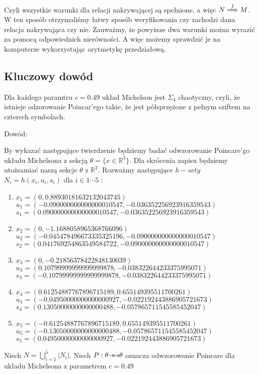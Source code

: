 Czyli wszystkie warunki dla relacji nakrywającej są spełnione, a więc $N \stackrel{f}{\Longrightarrow} M$. 
W ten sposób otrzymaliśmy łatwy sposób weryfikowania czy zachodzi dana relacja nakrywająca czy nie. Zauważmy, że powyższe dwa 
warunki można wyrazić za pomocą odpowiednich nierówności. A więc możemy sprawdzić je na komputerze wykorzystując arytmetykę przedziałową.

\subsection{Kluczowy dowód}

\begin{theorem}
  Dla każdego paramtru $ c = 0.49 $ układ Michelson jest $ \Sigma_4 $ chaotyczny,
  czyli, że istnieje odzorowanie Poincar'ego takie, że jest półsprzężone z pełnym sziftem na czterech symbolach.
\end{theorem}

Dowód:

By wykazać następujące twierdzenie będziemy badać odwzorowanie Poincare'go układu Michelsona z sekcją $ \theta = \{ x \in \mathbb R^3 \} $.
Dla skrócenia zapisu będziemy utożsamiać naszą sekcje $ \theta $ z $ \mathbb R^2 $.
Rozważmy następujące $ h-sety $ $ N_i = h(x_i,u_i,s_i) $ dla $ i \in 1 \cdots 5 $ :

\begin{enumerate}
\item $ x_1 = (0,0.88930181632132043745) $ $ u_1 = (-0.090000000000000010547,-0.036352256923916359543) $ $ s_1 = (0.090000000000000010547,-0.036352256923916359543) $ 
\item $ x_2 = (0,-1.1688058965368766096) $ $ u_2 = (-0.045478496673335325196,-0.090000000000000010547) $ $ s_2 = (0.041769254863549584722,-0.090000000000000010547) $ 
\item $ x_3 = (0,-0.21856378422848130039) $ $ u_3 = (0.10799999999999999878,-0.038322644233375995071) $ $ s_3 = (-0.10799999999999999878,-0.038322644233375995071) $ 
\item $ x_4 = (0.61254887767896715189,0.655149395511700261) $ $ u_4 = (-0.04950000000000000927,-0.022192443886905721673) $ $ s_4 = (0.13050000000000000488,-0.057865711545585452047) $ 
\item $ x_5 = (-0.61254887767896715189,0.655149395511700261) $ $ u_5 = (-0.13050000000000000488,-0.057865711545585452047) $ $ s_5 = (0.04950000000000000927,-0.022192443886905721673) $ 
\end{enumerate}

Niech $ N = \bigcup^5_{i=1} | N_i| $. Niech $ P : \theta {\mathrel{\longrightarrow\mkern-25mu\circ}\;\;} \theta $ oznacza odwzorowanie Poincare dla układu Michelsona z parametrem $ c = 0.49 $


